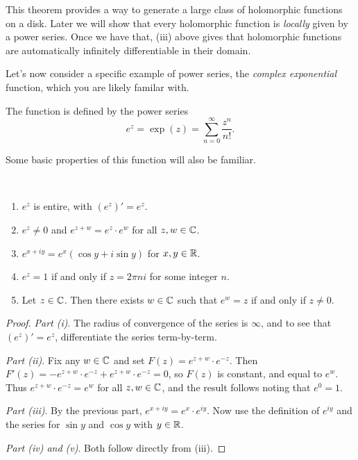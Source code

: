 \documentclass[a4paper]{scrartcl}
\begin{document}
\begin{remark}
    This theorem provides a way to generate a large class of holomorphic functions on a disk. Later we will show that every holomorphic function is \emph{locally} given by a power series. Once we have that, (iii) above gives that holomorphic functions are automatically infinitely differentiable in their domain.
\end{remark}

Let's now consider a specific example of power series, the \emph{complex exponential} function, which you are likely familar with.

\begin{definition}
    The  function is defined by the power series
    $$
    e^z = \exp(z) = \sum_{n = 0}^{\infty} \frac{z^n}{n!}.
    $$
\end{definition}

Some basic properties of this function will also be familiar.

\begin{proposition}~
        \vspace*{-1.5\baselineskip}
    \begin{enumerate}[label=(\roman*)]
        \item $e^z$ is entire, with $(e^z)' = e^z$.
        \item $e^z \neq 0$ and $e^{z + w} = e^z  \cdot e^w$ for all $z, w \in \mathbb{C}$.
        \item $e^{x + iy} = e^x(\cos y + i \sin y)$ for $x, y \in \mathbb{R}$.
        \item $e^z = 1$ if and only if $z = 2\pi n i$ for some integer $n$.
        \item Let $z \in \mathbb{C}$. Then there exists $w \in \mathbb{C}$ such that $e^w = z$ if and only if $z \neq 0$.
    \end{enumerate}
\end{proposition}
\begin{proof}
    \emph{Part (i)}. The radius of convergence of the series is $\infty$, and to see that $(e^z)' = e^z$, differentiate the series term-by-term.

    \emph{Part (ii)}. Fix any $w \in \mathbb{C}$ and set $F(z) = e^{z + w} \cdot e^{-z}$. Then $F'(z) = - e^{z + w} \cdot e^{-z} + e^{z + w} \cdot e^{-z} = 0$, so $F(z)$ is constant, and equal to $e^w$. Thus $e^{z + w} \cdot e^{-z} = e^w$ for all $z, w \in \mathbb{C}$, and the result follows noting that $e^0 = 1$.

    \emph{Part (iii)}. By the previous part, $e^{x + iy} = e^x \cdot e^{iy}$. Now use the definition of $e^{iy}$ and the series for $\sin y$ and $\cos y$ with $y \in \mathbb{R}$.

    \emph{Part (iv) and (v)}. Both follow directly from (iii).
\end{proof}
\end{document}
